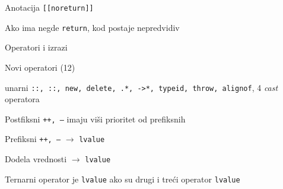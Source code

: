 \documentclass{article}
\newenvironment{xitemize}{%
    
    \itemize
    \larger
}{%
    \enditemize
}
\let\olditemize\itemize
\let\endolditemize\enditemize
\renewenvironment{itemize}{%
    \smaller
    \olditemize
}{%
    \endolditemize
}
\providecommand{\inlinecode}[1]{\texttt{#1}}
\begin{document}
\begin{xitemize}
\begin{itemize}
    \item Anotacija \inlinecode{[[noreturn]]}
    \item Ako ima negde \inlinecode{return}, kod postaje nepredvidiv
\end{itemize}
\item Operatori i izrazi
\begin{itemize}
    \item Novi operatori (12)
    \begin{itemize}
        \item[] unarni \inlinecode{::, ::, new, delete, .*, ->*, typeid, throw, alignof}, 4 \textit{cast} operatora
    \end{itemize}
    \item Postfiksni \inlinecode{++, --} imaju viši prioritet od prefiksnih
    \item Prefiksni \inlinecode{++, --} $\rightarrow$ \inlinecode{lvalue}
    \item Dodela vrednosti $\rightarrow$ \inlinecode{lvalue}
    \item Ternarni operator je \inlinecode{lvalue} ako su drugi i treći operator \inlinecode{lvalue}
\end{itemize}



\end{xitemize}
\end{document}

